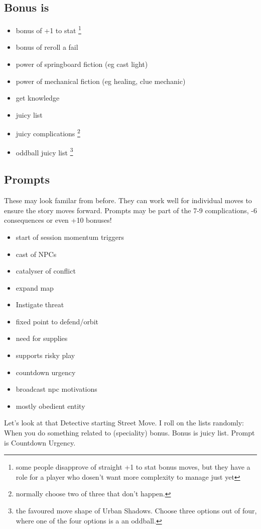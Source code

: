 \documentclass{tufte-handout}
\begin{document}
\subsection{Bonus is}
\begin{itemize}
\item bonus of +1 to stat  \footnote{some people disapprove of straight +1 to stat bonus moves, but they have a role for a player who dosen't want more complexity to manage just yet}
\item bonus of reroll a fail
\item power of springboard fiction (eg cast light)
\item power of mechanical fiction (eg healing, clue mechanic)
\item get knowledge 
\item juicy list
\item juicy complications \footnote{normally choose two of three that don't happen.}
\item oddball juicy list \footnote{the favoured move shape of Urban Shadows. Choose three options out of four, where one of the four options is a an oddball.}
\end{itemize}

\subsection{Prompts}
These may look familar from before. They can work well for individual moves to ensure the story moves forward. Prompts may be part of the 7-9 complications, -6 consequences or even +10 bonuses!
\begin{itemize}
\item start of session momentum triggers 
\item cast of NPCs 
\item catalyser of conflict 
\item expand map
\item Instigate threat
\item fixed point to defend/orbit
\item need for supplies
\item supports risky play
\item countdown urgency
\item broadcast npc motivations
\item mostly obedient entity
\end{itemize}

Let's look at that Detective starting Street Move. I roll on the lists randomly:
When you do something related to (speciality) bonus. Bonus is juicy list. Prompt is Countdown Urgency.
\end{document}
